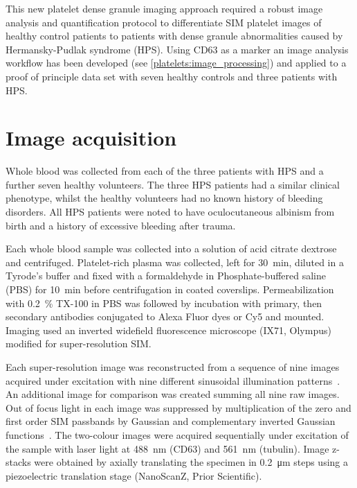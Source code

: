 This new platelet dense granule imaging approach required a robust image analysis and quantification protocol to differentiate SIM platelet images of healthy control patients to patients with dense granule abnormalities caused by Hermansky-Pudlak syndrome (HPS). Using CD63 as a marker an image analysis workflow has been developed (see \autoref{platelets:image_processing}) and applied to a proof of principle data set with seven healthy controls and three patients with HPS.

\section{Image acquisition}
\label{platelets:image_acquisition}
Whole blood was collected from each of the three patients with HPS and a further seven healthy volunteers. The three HPS patients had a similar clinical phenotype, whilst the healthy volunteers had no known history of bleeding disorders. All HPS patients were noted to have oculocutaneous albinism from birth and a history of excessive bleeding after trauma.

Each whole blood sample was collected into a solution of acid citrate dextrose and centrifuged. Platelet-rich plasma was collected, left for \SI{30}{\minute}, diluted in a Tyrode’s buffer and fixed with a formaldehyde in Phosphate-buffered saline (PBS) for \SI{10}{\minute} before  centrifugation in coated coverslips. Permeabilization with \SI{0.2}{\percent} TX-100 in PBS was followed by incubation with primary, then secondary antibodies conjugated to Alexa Fluor dyes or Cy5 and mounted. Imaging used an inverted widefield fluorescence microscope (IX71, Olympus) modified for super-resolution SIM.

Each super-resolution image was reconstructed from a sequence of nine images acquired under excitation with nine different sinusoidal illumination patterns~\cite{Gustafsson2008}. An additional image for comparison was created summing all nine raw images. Out of focus light in each image was suppressed by multiplication of the zero and first order SIM passbands by Gaussian and complementary inverted Gaussian functions~\cite{Holleran2014}. The two-colour images were acquired sequentially under excitation of the sample with laser light at \SI{488}{\nano\meter} (CD63) and \SI{561}{\nano\meter} (tubulin). Image z-stacks were obtained by axially translating the specimen in \SI{0.2}{\micro\meter} steps using a piezoelectric translation stage (NanoScanZ, Prior Scientific).

